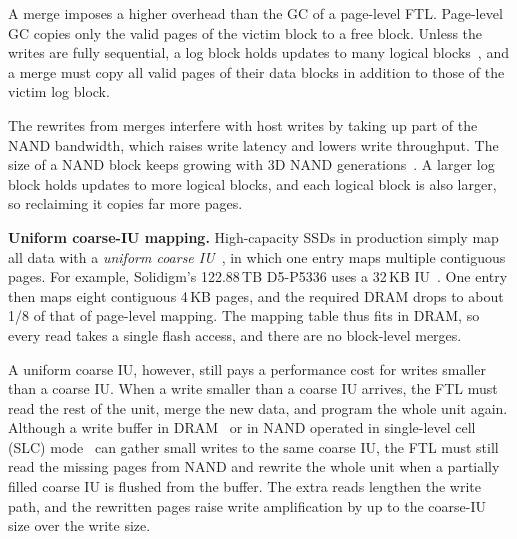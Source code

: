 A merge imposes a higher overhead than the GC of a page-level FTL. Page-level GC copies
only the valid pages of the victim block to a free block. Unless the writes are fully
sequential, a log block holds updates to many logical blocks~\cite{fast}, and a merge must
copy all valid pages of their data blocks in addition to those of the victim log block.

The rewrites from merges interfere with host writes by taking up part of the NAND bandwidth, which raises
write latency and lowers write throughput. The size of a NAND block keeps
growing with 3D NAND generations~\cite{pen}. A larger log block holds updates to
more logical blocks, and each logical block is also larger, so reclaiming it copies
far more pages.

\textbf{Uniform coarse-IU mapping.}
High-capacity SSDs in production simply map all data with a
\emph{uniform coarse IU}~\cite{micron-iu}, in which one entry maps multiple contiguous pages.
For example, Solidigm's 122.88\,TB D5-P5336 uses a 32\,KB IU~\cite{solidigm-p5336-spec}.
One entry then maps eight contiguous 4\,KB pages, and the required DRAM drops to about 1/8 of
that of page-level mapping. The mapping table thus fits in DRAM, so every read takes a single
flash access, and there are no block-level merges.

A uniform coarse IU, however, still pays a performance cost for writes smaller than a coarse IU. When a write smaller than a
coarse IU arrives, the FTL must read the rest of the unit, merge the new data, and
program the whole unit again.
Although a write buffer in DRAM~\cite{bplru} or in NAND operated in single-level cell (SLC) mode~\cite{samsung-turbowrite}
can gather small writes to the same coarse IU, the FTL must still
read the missing pages from NAND and rewrite the whole unit when a partially filled coarse IU
is flushed from the buffer.
The extra reads lengthen the write path, and the rewritten pages raise write
amplification by up to the coarse-IU size over the write size.

